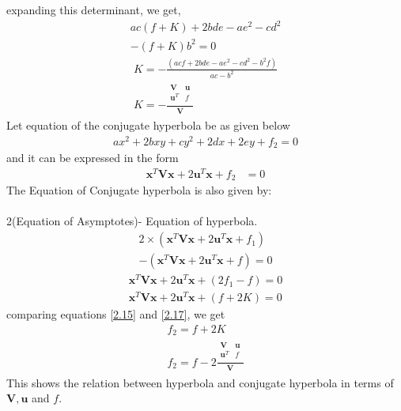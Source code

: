 \documentclass[journal,12pt,twocolumn]{IEEEtran}
\let\vec\mathbf
\numberwithin{equation}{subsection}
\begin{document}
expanding this determinant, we get,
\begin{multline}
ac(f+K) + 2bde -a e^2 -cd^2 \\-(f+K)b^2 =0
\end{multline}
\begin{align}
K = - \frac{(acf + 2bde -ae^2 -cd^2 -b^2f)}{ac-b^2}\\
K= - \frac{\begin{array}{|cc|}\vec{V} & \vec{u} \\ \vec{u}^T& f\\
\end{array}}{\begin{array}{|c|}{\vec{V}}\end{array}}
\end{align}
Let equation of the conjugate hyperbola be as given below
\begin{align}
ax^2+2bxy+cy^2+2dx+2ey+f_2=0\label{2.14}
\end{align}
 and it can be expressed in the form 
\begin{align}
\vec{x}^T\vec{V}\vec{x}+2\vec{u}^T\vec{x}+f_2&=0 \label{2.15}
\end{align}
 The Equation of Conjugate hyperbola is also given by:\\
\\
2(Equation of Asymptotes)- Equation of hyperbola.\\
\begin{multline}
2 \times (\vec{x}^T\vec{V}\vec{x}+2\vec{u}^T\vec{x}+f_1)\\ -(\vec{x}^T\vec{V}\vec{x}+2\vec{u}^T\vec{x}+f)=0 
\end{multline}
\begin{align}
\vec{x}^T\vec{V}\vec{x}+2\vec{u}^T\vec{x}+(2f_1 -f)= 0\label{2.16}\\
\vec{x}^T\vec{V}\vec{x}+2\vec{u}^T\vec{x}+(f + 2K)= 0\label{2.17}
\end{align}
comparing equations  \ref{2.15} and \ref{2.17}, we get
\begin{align}
f_2 = f+ 2K\\
f_2 = f - 2 \frac{\begin{array}{|cc|}\vec{V} & \vec{u} \\ \vec{u}^T& f\\
\end{array}}{\begin{array}{|c|}{\vec{V}}\end{array}}
\end{align}
This shows the  relation between hyperbola and conjugate hyperbola in terms of $\vec{V} , \vec{u}$ and $f$. 
\end{document}
